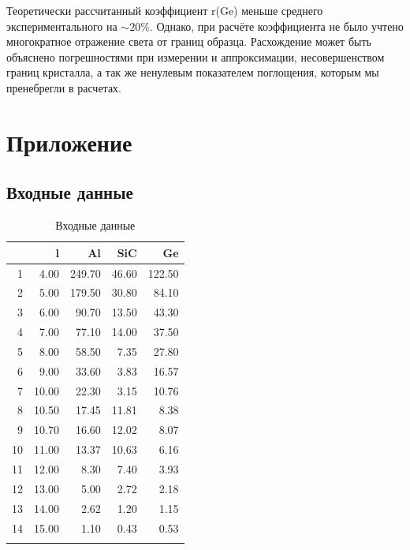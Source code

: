 \documentclass[a4paper,11pt]{report}\usepackage[]{graphicx}\usepackage[]{color}
\begin{document}
Теоретически рассчитанный коэффициент r(Ge) меньше среднего экспериментального на $\sim 20\%$. Однако, при расчёте коэффициента не было учтено многократное отражение света от границ образца. Расхождение может быть объяснено погрешностями при измерении и аппроксимации, несовершенством границ кристалла, а так же ненулевым показателем поглощения, которым мы пренебрегли в расчетах. 


\chapter*{Приложение} \label{Appendix}
\section*{Входные данные}

{\small
\begin{longtable}{|r|r|rrr|}
  \hline
 & l & Al & SiC & Ge \\ 
  \hline
1 & 4.00 & 249.70 & 46.60 & 122.50 \\ 
  2 & 5.00 & 179.50 & 30.80 & 84.10 \\ 
  3 & 6.00 & 90.70 & 13.50 & 43.30 \\ 
  4 & 7.00 & 77.10 & 14.00 & 37.50 \\ 
  5 & 8.00 & 58.50 & 7.35 & 27.80 \\ 
  6 & 9.00 & 33.60 & 3.83 & 16.57 \\ 
  7 & 10.00 & 22.30 & 3.15 & 10.76 \\ 
  8 & 10.50 & 17.45 & 11.81 & 8.38 \\ 
  9 & 10.70 & 16.60 & 12.02 & 8.07 \\ 
  10 & 11.00 & 13.37 & 10.63 & 6.16 \\ 
  11 & 12.00 & 8.30 & 7.40 & 3.93 \\ 
  12 & 13.00 & 5.00 & 2.72 & 2.18 \\ 
  13 & 14.00 & 2.62 & 1.20 & 1.15 \\ 
  14 & 15.00 & 1.10 & 0.43 & 0.53 \\ 
   \hline
\hline
\caption{Входные данные} 
\end{longtable}
}






\end{document}
